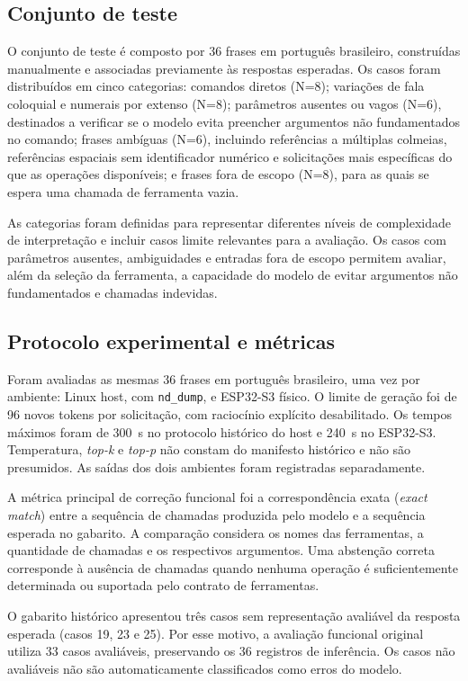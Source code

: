 \documentclass[12pt]{article}
\begin{document}
\subsection{Conjunto de teste}

O conjunto de teste é composto por 36 frases em português brasileiro,
construídas manualmente e associadas previamente às respostas esperadas.
Os casos foram distribuídos em cinco categorias: comandos diretos (N=8);
variações de fala coloquial e numerais por extenso (N=8); parâmetros
ausentes ou vagos (N=6), destinados a verificar se o modelo evita
preencher argumentos não fundamentados no comando; frases ambíguas
(N=6), incluindo referências a múltiplas colmeias, referências espaciais
sem identificador numérico e solicitações mais específicas do que as
operações disponíveis; e frases fora de escopo (N=8), para as quais se
espera uma chamada de ferramenta vazia.

As categorias foram definidas para representar diferentes níveis de
complexidade de interpretação e incluir casos limite relevantes para a
avaliação. Os casos com parâmetros ausentes, ambiguidades e entradas fora
de escopo permitem avaliar, além da seleção da ferramenta, a capacidade
do modelo de evitar argumentos não fundamentados e chamadas indevidas.


\subsection{Protocolo experimental e métricas}

Foram avaliadas as mesmas 36 frases em português brasileiro, uma vez por ambiente: Linux host, com \texttt{nd\_dump}, e ESP32-S3 físico. O limite de geração foi de 96 novos tokens por solicitação, com raciocínio explícito desabilitado. Os tempos máximos foram de 300~s no protocolo histórico do host e 240~s no ESP32-S3. Temperatura, \textit{top-k} e \textit{top-p} não constam do manifesto histórico e não são presumidos. As saídas dos dois ambientes foram registradas separadamente.

A métrica principal de correção funcional foi a
correspondência exata (\textit{exact match}) entre a
sequência de chamadas produzida pelo modelo e a
sequência esperada no gabarito. A comparação considera
os nomes das ferramentas, a quantidade de chamadas
e os respectivos argumentos. Uma abstenção correta
corresponde à ausência de chamadas quando nenhuma
operação é suficientemente determinada ou suportada
pelo contrato de ferramentas.

O gabarito histórico apresentou três casos sem
representação avaliável da resposta esperada
(casos 19, 23 e 25). Por esse motivo, a avaliação
funcional original utiliza 33 casos avaliáveis,
preservando os 36 registros de inferência. Os casos
não avaliáveis não são automaticamente classificados
como erros do modelo.
\end{document}

